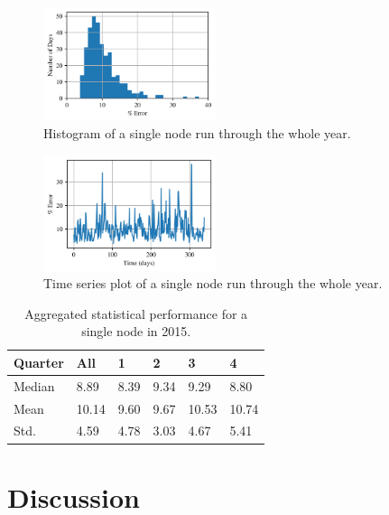 \documentclass[sigconf]{acmart}
\begin{document}
\begin{figure}[h]
\includegraphics[width=0.45\textwidth]{fig_7.png}
\caption{Histogram of a single node run through the whole year.}
\label{fig:hist_single}
\end{figure}

\begin{figure}[h]
\includegraphics[width=0.45\textwidth]{fig_8.png}
\caption{Time series plot of a single node run through the whole year.}
\label{fig:time_single}
\end{figure}

\begin{table}[]
\begin{tabular}{llllll}
\hline
Quarter & All   & 1    & 2    & 3     & 4     \\
\hline
Median  & 8.89  & 8.39 & 9.34 & 9.29  & 8.80  \\
Mean    & 10.14 & 9.60 & 9.67 & 10.53 & 10.74 \\
Std.    & 4.59  & 4.78 & 3.03 & 4.67  & 5.41 \\
\hline
\end{tabular}
\caption{Aggregated statistical performance for a single node in 2015.}
\label{tab:single}
\end{table}


\section{Discussion}
\label{sec:discussion}
\end{document}
